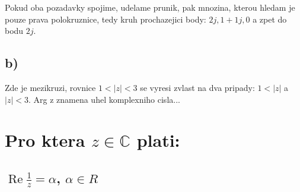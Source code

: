 Pokud oba pozadavky spojime, udelame prunik, pak mnozina, kterou hledam je pouze prava polokruznice, tedy kruh prochazejici body: $2j, 1+1j, 0$ a zpet do bodu $2j$.

\subsection*{b)}
Zde je mezikruzi, rovnice $1 < |z| < 3$ se vyresi zvlast na dva pripady:
$1<|z|$ a $|z|<3$. Arg z znamena uhel komplexniho cisla...

\section{Pro ktera $z \in \mathbb{C}$ plati:}
\subsection*{$\operatorname{Re} \frac{1}{z} = \alpha$, $\alpha \in R$}



